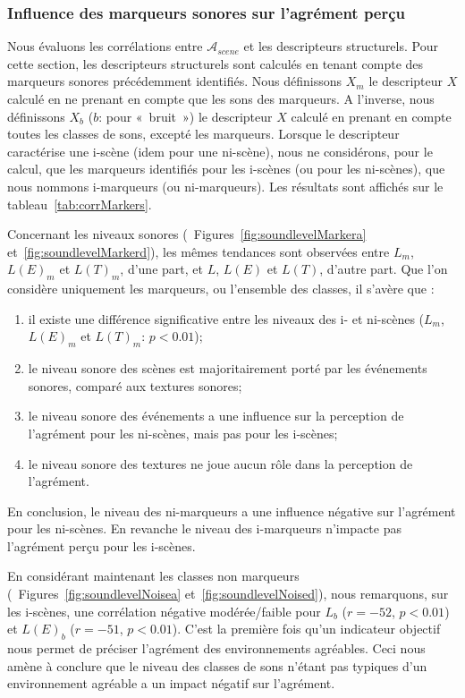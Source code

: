 \documentclass[twoside,twocolumn]{article}
\begin{document}
\subsubsection*{Influence des marqueurs sonores sur l'agrément perçu}

Nous évaluons les corrélations entre $\mathcal{A}_{scene}$ et les descripteurs structurels. Pour cette section, les descripteurs structurels sont calculés en tenant compte des marqueurs sonores précédemment identifiés. Nous définissons $X_m$ le descripteur $X$ calculé en ne prenant en compte que les sons des marqueurs. A l'inverse, nous définissons $X_b$ ($b$: pour «~bruit~») le descripteur $X$ calculé en prenant en compte toutes les classes de sons, excepté les marqueurs. Lorsque le descripteur caractérise une i-scène (idem pour une ni-scène), nous ne considérons, pour le calcul, que les marqueurs identifiés pour les i-scènes (ou pour les ni-scènes), que nous nommons i-marqueurs (ou ni-marqueurs). Les résultats sont affichés sur le tableau~\ref{tab:corrMarkers}.

Concernant les niveaux sonores (\cf~Figures~\ref{fig:soundlevelMarkera} et~\ref{fig:soundlevelMarkerd}), les mêmes tendances sont observées entre $L_m$, $L(E)_m$ et $L(T)_m$, d'une part, et $L$, $L(E)$ et $L(T)$, d'autre part. Que l'on considère uniquement les marqueurs, ou l'ensemble des classes, il s'avère que :

\begin{enumerate}
\item il existe une différence significative entre les niveaux des i- et ni-scènes ($L_m$, $L(E)_m$ et $L(T)_m$: $p<0.01$);
\item le niveau sonore des scènes est majoritairement porté par les événements sonores, comparé aux textures sonores;
\item le niveau sonore des événements a une influence sur la perception de l'agrément pour les ni-scènes, mais pas pour les i-scènes;
\item le niveau sonore des textures ne joue aucun rôle dans la perception de l'agrément.
\end{enumerate}

En conclusion, le niveau des ni-marqueurs a une influence négative sur l'agrément pour les ni-scènes. En revanche le niveau des i-marqueurs n’impacte pas l'agrément perçu pour les i-scènes.

En considérant maintenant les classes non marqueurs (\cf~Figures~\ref{fig:soundlevelNoisea} et~\ref{fig:soundlevelNoised}), nous remarquons, sur les i-scènes, une corrélation négative modérée/faible pour $L_b$  ($r=-52$, $p<0.01$) et $L(E)_b$ ($r=-51$, $p<0.01$). C'est la première fois qu'un indicateur objectif nous permet de préciser l'agrément des environnements agréables. Ceci nous amène à conclure que le niveau des classes de sons n'étant pas typiques d'un environnement agréable a un impact négatif sur l'agrément. 
\end{document}
